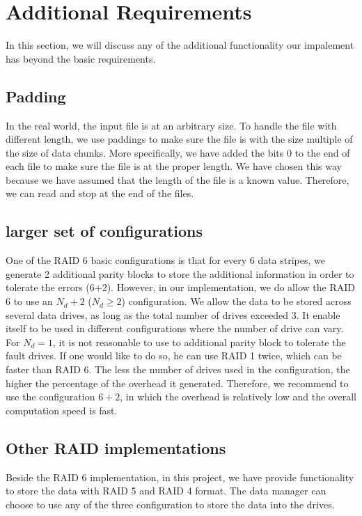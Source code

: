 \section{Additional Requirements}

In this section, we will discuss any of the additional functionality our impalement has beyond the basic requirements. 

\subsection{Padding}

In the real world, the input file is at an arbitrary size. To handle the file with different length, we use paddings to make sure the file is with the size multiple of the size of data chunks. More specifically, we have added the bits 0 to the end of each file to make sure the file is at the proper length. We have chosen this way because we have assumed that the length of the file is a known value. Therefore, we can read and stop at the end of the files. 

\subsection{larger set of configurations}

One of the RAID 6 basic configurations is that for every 6 data stripes, we generate 2 additional parity blocks to store the additional information in order to tolerate the errors (6+2). However, in our implementation, we do allow the RAID 6 to use an $N_d+2$ ($N_d \geq 2$) configuration. We allow the data to be stored across several data drives, as long as the total number of drives exceeded 3. It enable itself to be used in different configurations where the number of drive can vary. For $N_d = 1$, it is not reasonable to use to additional parity block to tolerate the fault drives. If one would like to do so, he can use RAID 1 twice, which can be faster than RAID 6. The less the number of drives used in the configuration, the higher the percentage of the overhead it generated. Therefore, we recommend to use the configuration $6 + 2$, in which the overhead is relatively low and the overall computation speed is fast.

\subsection{Other RAID implementations}

Beside the RAID 6 implementation, in this project, we have provide functionality to store the data with RAID 5 and RAID 4 format. The data manager can choose to use any of the three configuration to store the data into the drives.

